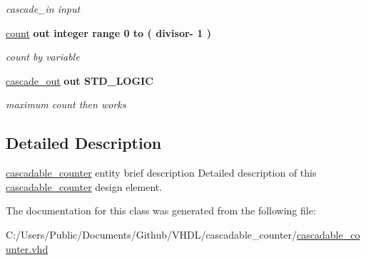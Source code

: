 \begin{DoxyCompactItemize}
\begin{DoxyCompactList}\small\item\em cascade\+\_\+in input \end{DoxyCompactList}\item 
\hyperlink{classcascadable__counter_aaca90a4bb78d0c63502de161d6f2197c}{count}  {\bfseries {\bfseries \textcolor{vhdlchar}{out}\textcolor{vhdlchar}{ }}} {\bfseries \textcolor{vhdlchar}{integer}\textcolor{vhdlchar}{ }\textcolor{vhdlchar}{ }\textcolor{vhdlchar}{ }\textcolor{vhdlchar}{range}\textcolor{vhdlchar}{ }\textcolor{vhdlchar}{ } \textcolor{vhdldigit}{0} \textcolor{vhdlchar}{ }\textcolor{vhdlchar}{to}\textcolor{vhdlchar}{ }\textcolor{vhdlchar}{(}\textcolor{vhdlchar}{ }\textcolor{vhdlchar}{ }\textcolor{vhdlchar}{ }\textcolor{vhdlchar}{ }\textcolor{vhdlchar}{divisor}\textcolor{vhdlchar}{-\/}\textcolor{vhdlchar}{ } \textcolor{vhdldigit}{1} \textcolor{vhdlchar}{ }\textcolor{vhdlchar}{)}\textcolor{vhdlchar}{ }} \hypertarget{classcascadable__counter_aaca90a4bb78d0c63502de161d6f2197c}{}\label{classcascadable__counter_aaca90a4bb78d0c63502de161d6f2197c}

\begin{DoxyCompactList}\small\item\em count by variable \end{DoxyCompactList}\item 
\hyperlink{classcascadable__counter_aebe3fcbeecb083647db0f3cfb205d03d}{cascade\+\_\+out}  {\bfseries {\bfseries \textcolor{vhdlchar}{out}\textcolor{vhdlchar}{ }}} {\bfseries \textcolor{vhdlchar}{S\+T\+D\+\_\+\+L\+O\+G\+IC}\textcolor{vhdlchar}{ }} \hypertarget{classcascadable__counter_aebe3fcbeecb083647db0f3cfb205d03d}{}\label{classcascadable__counter_aebe3fcbeecb083647db0f3cfb205d03d}

\begin{DoxyCompactList}\small\item\em maximum count then works \end{DoxyCompactList}\end{DoxyCompactItemize}


\subsection{Detailed Description}
\hyperlink{classcascadable__counter}{cascadable\+\_\+counter} entity brief description Detailed description of this \hyperlink{classcascadable__counter}{cascadable\+\_\+counter} design element. 

The documentation for this class was generated from the following file\+:\begin{DoxyCompactItemize}
\item 
C\+:/\+Users/\+Public/\+Documents/\+Github/\+V\+H\+D\+L/cascadable\+\_\+counter/\hyperlink{cascadable__counter_8vhd}{cascadable\+\_\+counter.\+vhd}\end{DoxyCompactItemize}
